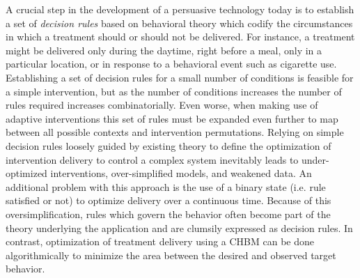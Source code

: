 \documentclass[runningheads,a4paper]{llncs}
\begin{document}
A crucial step in the development of a persuasive technology today is to establish a set of \emph{decision rules} based on behavioral theory which codify the circumstances in which a treatment should or should not be delivered.
For instance, a treatment might be delivered only during the daytime, right before a meal, only in a particular location, or in response to a behavioral event such as cigarette use.
Establishing a set of decision rules for a small number of conditions is feasible for a simple intervention, but as the number of conditions increases the number of rules required increases combinatorially.
Even worse, when making use of adaptive interventions this set of rules must be expanded even further to map between all possible contexts and intervention permutations.
Relying on simple decision rules loosely guided by existing theory to define the optimization of intervention delivery to control a complex system inevitably leads to under-optimized interventions, over-simplified models, and weakened data.
An additional problem with this approach is the use of a binary state (i.e. rule satisfied or not) to optimize delivery over a continuous time.
Because of this oversimplification, rules which govern the behavior often become part of the theory underlying the application and are clumsily expressed as decision rules.
In contrast, optimization of treatment delivery using a CHBM can be done algorithmically to minimize the area between the desired and observed target behavior.
\end{document}
